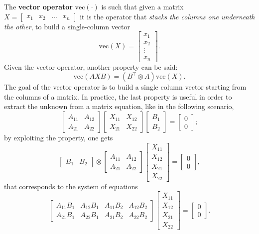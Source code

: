 \documentclass[10pt]{report}
\begin{document}
The \textbf{vector operator} \(\mbox{vec}(\cdot)\) is such that given a matrix \(X = \begin{bmatrix}x_1 & x_2 & \dots & x_n\end{bmatrix}\) it is the operator that \emph{stacks the columns one underneath the other}, to build a single\--column vector $$\mbox{vec}(X) = \begin{bmatrix}x_1 \\ x_2 \\ \vdots \\ x_n\end{bmatrix}.$$ Given the vector operator, another property can be said: $$\mbox{vec}(AXB) = (B^\top \otimes A)\mbox{vec}(X).$$ The goal of the vector operator is to build a single column vector starting from the columns of a matrix. In practice, the last property is useful in order to extract the unknown from a matrix equation, like in the following scenario,
$$\begin{bmatrix} A_{11} & A_{12} \\ A_{21} & A_{22}\end{bmatrix}\begin{bmatrix}X_{11} & X_{12} \\ X_{21} & X_{22}\end{bmatrix}\begin{bmatrix}B_{1} \\ B_{2}\end{bmatrix} = \begin{bmatrix} 0 \\ 0\end{bmatrix};$$ by exploiting the property, one gets
$$\begin{bmatrix}B_1 & B_2\end{bmatrix} \otimes \begin{bmatrix} A_{11} & A_{12} \\ A_{21} & A_{22}\end{bmatrix}\begin{bmatrix}X_{11} \\ X_{12} \\ X_{21} \\ X_{22}\end{bmatrix} = \begin{bmatrix} 0 \\ 0\end{bmatrix},$$ that corresponds to the system of equations
$$\begin{bmatrix} A_{11}B_1 & A_{12}B_1 & A_{11}B_{2} & A_{12}B_2 \\ A_{21}B_1 & A_{22}B_1 & A_{21}B_2 & A_{22}B_2\end{bmatrix}\begin{bmatrix}X_{11} \\ X_{12} \\ X_{21} \\ X_{22}\end{bmatrix} = \begin{bmatrix} 0 \\ 0\end{bmatrix}.$$
\end{document}
